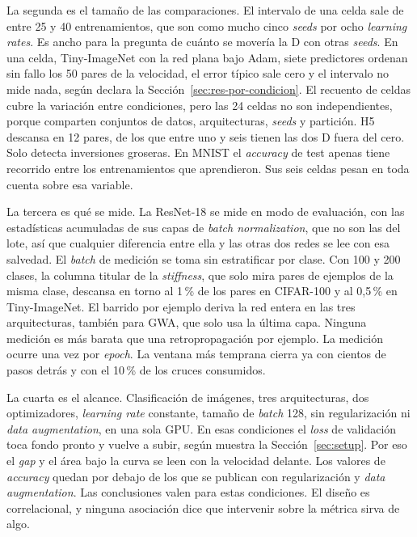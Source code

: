 La segunda es el tamaño de las comparaciones. El intervalo de una celda sale de entre 25 y 40 entrenamientos, que son como mucho cinco \emph{seeds} por ocho \emph{learning rates}. Es ancho para la pregunta de cuánto se movería la D con otras \emph{seeds}. En una celda, Tiny-ImageNet con la red plana bajo Adam, siete predictores ordenan sin fallo los 50 pares de la velocidad, el error típico sale cero y el intervalo no mide nada, según declara la Sección~\ref{sec:res-por-condicion}. El recuento de celdas cubre la variación entre condiciones, pero las 24 celdas no son independientes, porque comparten conjuntos de datos, arquitecturas, \emph{seeds} y partición. H5 descansa en 12 pares, de los que entre uno y seis tienen las dos D fuera del cero. Solo detecta inversiones groseras. En MNIST el \emph{accuracy} de test apenas tiene recorrido entre los entrenamientos que aprendieron. Sus seis celdas pesan en toda cuenta sobre esa variable.

La tercera es qué se mide. La ResNet-18 se mide en modo de evaluación, con las estadísticas acumuladas de sus capas de \emph{batch normalization}, que no son las del lote, así que cualquier diferencia entre ella y las otras dos redes se lee con esa salvedad. El \emph{batch} de medición se toma sin estratificar por clase. Con 100 y 200 clases, la columna titular de la \emph{stiffness}, que solo mira pares de ejemplos de la misma clase, descansa en torno al 1\,\% de los pares en CIFAR-100 y al 0,5\,\% en Tiny-ImageNet. El barrido por ejemplo deriva la red entera en las tres arquitecturas, también para GWA, que solo usa la última capa. Ninguna medición es más barata que una retropropagación por ejemplo. La medición ocurre una vez por \emph{epoch}. La ventana más temprana cierra ya con cientos de pasos detrás y con el 10\,\% de los cruces consumidos.

La cuarta es el alcance. Clasificación de imágenes, tres arquitecturas, dos optimizadores, \emph{learning rate} constante, tamaño de \emph{batch} 128, sin regularización ni \emph{data augmentation}, en una sola GPU. En esas condiciones el \emph{loss} de validación toca fondo pronto y vuelve a subir, según muestra la Sección~\ref{sec:setup}. Por eso el \emph{gap} y el área bajo la curva se leen con la velocidad delante. Los valores de \emph{accuracy} quedan por debajo de los que se publican con regularización y \emph{data augmentation}. Las conclusiones valen para estas condiciones. El diseño es correlacional, y ninguna asociación dice que intervenir sobre la métrica sirva de algo.

